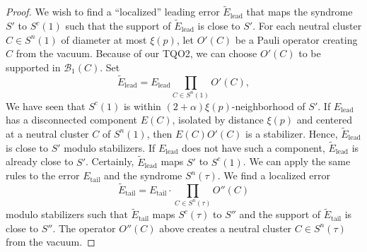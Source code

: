 \begin{proof}
We wish to find a ``localized'' leading error $\tilde{E}_\text{lead}$
that maps the syndrome $S'$ to $S^c(1)$ such that the support of
$\tilde{E}_\text{lead}$ is close to $S'$.
For each neutral cluster $C \in S^n(1)$ of diameter at most $\xi(p)$,
let $O'(C)$ be a Pauli operator creating $C$ from the vacuum.
Because of our TQO2, we can choose $O'(C)$ to be supported in $\mathcal B_1(C)$.
Set
\[
\tilde{E}_\text{lead} = E_\text{lead} \prod_{ C \in S^n(1) } O'(C),
\]
We have seen that $S^c(1)$ is within $(2+\alpha)\xi(p)$-neighborhood of $S'$.
If $E_\text{lead}$ has a disconnected component $E(C)$,
isolated by distance $\xi(p)$ and centered at a neutral cluster $C$ of $S^n(1)$,
then $E(C) O'(C)$ is a stabilizer.
Hence, $\tilde E_\text{lead}$ is close to $S'$ modulo stabilizers.
If $E_\text{lead}$ does not have such a component, $\tilde E_\text{lead}$ is already close to $S'$.
Certainly, $\tilde E_\text{lead}$ maps $S'$ to $S^c(1)$.
We can apply the same rules to the error $E_\text{tail}$ and the syndrome $S^n(\tau)$.
We find a localized error
\[
\tilde{E}_\text{tail} = E_\text{tail} \cdot \prod_{C \in S^n(\tau) } O''(C)
\]
modulo stabilizers
such that $\tilde{E}_\text{tail}$ maps $S^c(\tau)$ to $S''$ 
and the support of $\tilde{E}_\text{tail}$ is close to $S''$.
The operator $O''(C)$ above creates a neutral cluster $C \in S^n(\tau)$ from the vacuum.


\end{proof}
